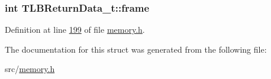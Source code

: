 \subsubsection[{\texorpdfstring{frame}{frame}}]{\setlength{\rightskip}{0pt plus 5cm}int T\+L\+B\+Return\+Data\+\_\+t\+::frame}\hypertarget{structTLBReturnData__t_ac4bdfa0ee74b50048e94321426877439}{}\label{structTLBReturnData__t_ac4bdfa0ee74b50048e94321426877439}


Definition at line \hyperlink{memory_8h_source_l00199}{199} of file \hyperlink{memory_8h_source}{memory.\+h}.



The documentation for this struct was generated from the following file\+:\begin{DoxyCompactItemize}
\item 
src/\hyperlink{memory_8h}{memory.\+h}\end{DoxyCompactItemize}
